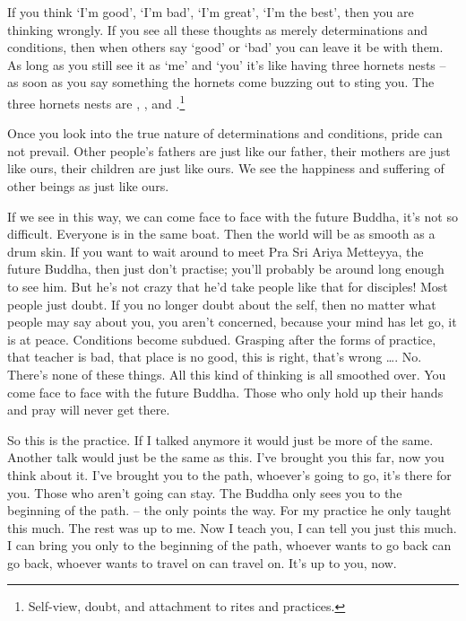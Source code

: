If you think `I'm good', `I'm bad', `I'm great', `I'm the best', then you are thinking wrongly. If you see all these thoughts as merely determinations and conditions, then when others say `good' or `bad' you can leave it be with them. As long as you still see it as `me' and `you' it's like having three hornets nests -- as soon as you say something the hornets come buzzing out to sting you. The three hornets nests are , , and .\footnote{Self-view, doubt, and attachment to rites and practices.} 

Once you look into the true nature of determinations and conditions, pride can not prevail. Other people's fathers are just like our father, their mothers are just like ours, their children are just like ours. We see the happiness and suffering of other beings as just like ours. 

If we see in this way, we can come face to face with the future Buddha, it's not so difficult. Everyone is in the same boat. Then the world will be as smooth as a drum skin. If you want to wait around to meet Pra Sri Ariya Metteyya, the future Buddha, then just don't practise; you'll probably be around long enough to see him. But he's not crazy that he'd take people like that for disciples! Most people just doubt. If you no longer doubt about the self, then no matter what people may say about you, you aren't concerned, because your mind has let go, it is at peace. Conditions become subdued. Grasping after the forms of practice, that teacher is bad, that place is no good, this is right, that's wrong \ldots{}. No. There's none of these things. All this kind of thinking is all smoothed over. You come face to face with the future Buddha. Those who only hold up their hands and pray will never get there. 

So this is the practice. If I talked anymore it would just be more of the same. Another talk would just be the same as this. I've brought you this far, now you think about it. I've brought you to the path, whoever's going to go, it's there for you. Those who aren't going can stay. The Buddha only sees you to the beginning of the path.  -- the  only points the way. For my practice he only taught this much. The rest was up to me. Now I teach you, I can tell you just this much. I can bring you only to the beginning of the path, whoever wants to go back can go back, whoever wants to travel on can travel on. It's up to you, now.


